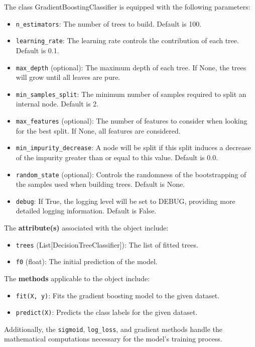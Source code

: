 \begin{appendices}
  The class GradientBoostingClassifier is equipped with the following parameters:
  \begin{itemize}
    \item \texttt{n\_estimators}: The number of trees to build. Default is 100.
    \item \texttt{learning\_rate}: The learning rate controls the contribution of each tree. Default is 0.1.
    \item \texttt{max\_depth} (optional): The maximum depth of each tree. If None, the trees will grow until all leaves are pure.
    \item \texttt{min\_samples\_split}: The minimum number of samples required to split an internal node. Default is 2.
    \item \texttt{max\_features} (optional): The number of features to consider when looking for the best split. If None, all features are considered.
    \item \texttt{min\_impurity\_decrease}: A node will be split if this split induces a decrease of the impurity greater than or equal to this value. Default is 0.0.
    \item \texttt{random\_state} (optional): Controls the randomness of the bootstrapping of the samples used when building trees. Default is None.
    \item \texttt{debug}: If True, the logging level will be set to DEBUG, providing more detailed logging information. Default is False.
  \end{itemize}

  The \textbf{attribute(s)} associated with the object include:
  \begin{itemize}
    \item \texttt{trees} (List[DecisionTreeClassifier]): The list of fitted trees.
    \item \texttt{f0} (float): The initial prediction of the model.
  \end{itemize}

  The \textbf{methods} applicable to the object include:
  \begin{itemize}
    \item \texttt{fit(X, y)}: Fits the gradient boosting model to the given dataset.
    \item \texttt{predict(X)}: Predicts the class labels for the given dataset.
  \end{itemize}

  Additionally, the \texttt{sigmoid}, \texttt{log\_loss}, and gradient methods handle the mathematical computations necessary for the model's training process.


\end{appendices}
